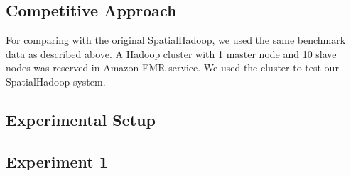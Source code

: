\subsection{Competitive Approach}
\label{sec:competitive}

For comparing with the original SpatialHadoop, we used the same benchmark data as described above. A Hadoop cluster with 1 master node and 10 slave nodes was reserved in Amazon EMR service. We used the cluster to test our SpatialHadoop system. 

\subsection{Experimental Setup}







\subsection{Experiment 1}
\label{subsec:Exp1}


